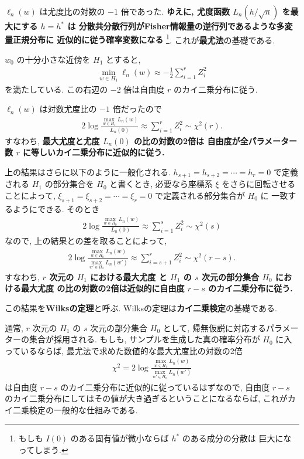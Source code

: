 \documentclass[12pt,twoside]{jarticle}
\theoremstyle{jplain}
\theoremstyle{jplain}
\theoremstyle{jplain}
\numberwithin{theorem}{section}
\numberwithin{equation}{section}
\numberwithin{figure}{section}
\numberwithin{table}{section}
\begin{document}
$\ell_n(w)$ は尤度比の対数の $-1$ 倍であった.
{\bfseries ゆえに, 尤度函数 $L_n(h/\sqrt{n})$ を最大にする $h=h^*$ は
分散共分散行列がFisher情報量の逆行列であるような多変量正規分布に
近似的に従う確率変数になる}%
\footnote{もしも $I(0)$ のある固有値が微小ならば $h^*$ のある成分の分散は
巨大になってしまう.}.
これが{\bfseries 最尤法}の基礎である.

$w_0$ の十分小さな近傍を $H_1$ とすると,
\begin{align*}
    \min_{w\in H_1}\ell_n(w)
    \approx -\frac{1}{2}\sum_{i=1}^r Z_i^2
\end{align*}
を満たしている. この右辺の $-2$ 倍は自由度 $r$ のカイ二乗分布に従う.

$\ell_n(w)$ は対数尤度比の $-1$ 倍だったので
\begin{align*}
  2\log\frac{\max_{w\in H_1} L_n(w)}{L_n(0)}
  \approx \sum_{i=1}^r Z_i^2
  \sim \chi^2(r).
\end{align*}
すなわち, {\bfseries 最大尤度と尤度 $L_n(0)$ の比の対数の2倍は
自由度が全パラメーター数 $r$ に等しいカイ二乗分布に近似的に従う.}

上の結果はさらに以下のように一般化される.
$h_{s+1}=h_{s+2}=\cdots=h_r=0$ で定義される $H_1$ の部分集合を $H_0$
と書くとき, 必要なら座標系 $\xi$ をさらに回転させることによって,
$\xi_{s+1}=\xi_{s+2}=\cdots=\xi_r=0$ で定義される部分集合が $H_0$ に
一致するようにできる. そのとき
\begin{align*}
  2\log\frac{\max_{w\in H_0} L_n(w)}{L_n(0)}
  \approx \sum_{i=1}^s Z_i^2
  \sim \chi^2(s)
\end{align*}
なので, 上の結果との差を取ることによって,
\begin{align*}
  2\log\frac{\max_{w\in H_0} L_n(w)}{\max_{w'\in H_0}L_n(w')}
  \approx \sum_{i=s+1}^r Z_i^2
  \sim \chi^2(r-s).
\end{align*}
すなわち,
{\bfseries $r$ 次元の $H_1$ における最大尤度
と $H_1$ の $s$ 次元の部分集合 $H_0$ における最大尤度
の比の対数の2倍は近似的に自由度 $r-s$ のカイ二乗分布に従う.}

この結果を{\bfseries Wilksの定理}と呼ぶ.
Wilksの定理は{\bfseries カイ二乗検定}の基礎である.

通常, $r$ 次元の $H_1$ の $s$ 次元の部分集合 $H_0$ として,
帰無仮説に対応するパラメーターの集合が採用される.
もしも, サンプルを生成した真の確率分布が $H_0$ に入っているならば,
最尤法で求めた数値的な最大尤度比の対数の2倍
\begin{align*}
  \chi^2 = 2\log\frac{\max_{w\in H_1} L_n(w)}{\max_{w'\in H_0}L_n(w')}
\end{align*}
は自由度 $r-s$ のカイ二乗分布に近似的に従っているはずなので,
自由度 $r-s$ のカイ二乗分布にしてはその値が大き過ぎるということになるならば,
これがカイ二乗検定の一般的な仕組みである.
\end{document}
